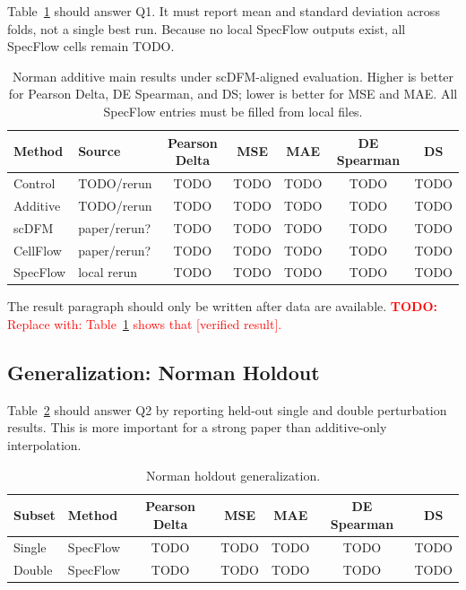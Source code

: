 \documentclass[11pt]{article}
\newcommand{\method}{SpecFlow}
\newcommand{\todo}[1]{\textcolor{red}{\textbf{TODO:} #1}}
\DeclareRobustCommand{\code}[1]{\texttt{\detokenize{#1}}}
\begin{document}
Table~\ref{tab:norman_additive} should answer Q1.
It must report mean and standard deviation across folds, not a single best run.
Because no local \method{} outputs exist, all \method{} cells remain TODO.

\begin{table}[t]
\centering
\caption{Norman additive main results under scDFM-aligned evaluation. Higher is better for Pearson Delta, DE Spearman, and DS; lower is better for MSE and MAE. All \method{} entries must be filled from local \code{agg\_results.csv} files.}
\label{tab:norman_additive}
\begin{tabular}{llccccc}
\toprule
Method & Source & Pearson Delta & MSE & MAE & DE Spearman & DS \\
\midrule
Control & TODO/rerun & TODO & TODO & TODO & TODO & TODO \\
Additive & TODO/rerun & TODO & TODO & TODO & TODO & TODO \\
scDFM & paper/rerun? & TODO & TODO & TODO & TODO & TODO \\
CellFlow & paper/rerun? & TODO & TODO & TODO & TODO & TODO \\
\method{} & local rerun & TODO & TODO & TODO & TODO & TODO \\
\bottomrule
\end{tabular}
\end{table}

The result paragraph should only be written after data are available.
\todo{Replace with: Table~\ref{tab:norman_additive} shows that [verified result].}

\subsection{Generalization: Norman Holdout}

Table~\ref{tab:norman_holdout} should answer Q2 by reporting held-out single and double perturbation results.
This is more important for a strong paper than additive-only interpolation.

\begin{table}[t]
\centering
\caption{Norman holdout generalization.}
\label{tab:norman_holdout}
\begin{tabular}{llccccc}
\toprule
Subset & Method & Pearson Delta & MSE & MAE & DE Spearman & DS \\
\midrule
Single & \method{} & TODO & TODO & TODO & TODO & TODO \\
Double & \method{} & TODO & TODO & TODO & TODO & TODO \\
\bottomrule
\end{tabular}
\end{table}
\end{document}
